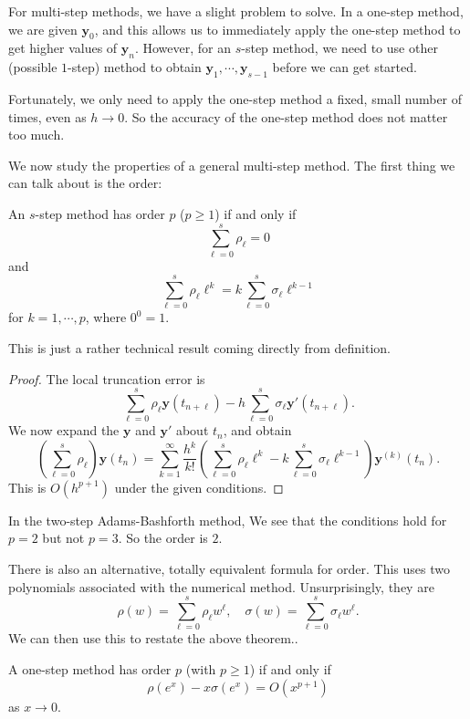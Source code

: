 \documentclass[a4paper]{article}
\begin{document}
For multi-step methods, we have a slight problem to solve. In a one-step method, we are given $\mathbf{y}_0$, and this allows us to immediately apply the one-step method to get higher values of $\mathbf{y}_n$. However, for an $s$-step method, we need to use other (possible $1$-step) method to obtain $\mathbf{y}_1, \cdots, \mathbf{y}_{s - 1}$ before we can get started.

Fortunately, we only need to apply the one-step method a fixed, small number of times, even as $h \to 0$. So the accuracy of the one-step method does not matter too much.

We now study the properties of a general multi-step method. The first thing we can talk about is the order:
\begin{thm}
  An $s$-step method has order $p$ ($p \geq 1$) if and only if
  \[
    \sum_{\ell = 0}^s \rho_\ell = 0
  \]
  and
  \[
    \sum_{\ell = 0}^s \rho_\ell \ell^k = k\sum_{\ell = 0}^s \sigma_\ell \ell^{k - 1}
  \]
  for $k = 1, \cdots, p$, where $0^0 = 1$.
\end{thm}

This is just a rather technical result coming directly from definition.
\begin{proof}
  The local truncation error is
  \[
    \sum_{\ell = 0}^s \rho_\ell \mathbf{y}(t_{n + \ell}) - h \sum_{\ell = 0}^s \sigma_\ell \mathbf{y}'(t_{n + \ell}).
  \]
  We now expand the $\mathbf{y}$ and $\mathbf{y}'$ about $t_n$, and obtain
  \[
    \left(\sum_{\ell = 0}^s \rho_\ell\right) \mathbf{y}(t_n) = \sum_{k = 1}^\infty \frac{h^k}{k!}\left(\sum_{\ell = 0}^s \rho_\ell \ell^k - k \sum_{\ell = 0}^s \sigma_\ell \ell^{k - 1}\right)\mathbf{y}^{(k)}(t_n).
  \]
  This is $O(h^{p + 1})$ under the given conditions.
\end{proof}

\begin{eg}[AB2]
  In the two-step Adams-Bashforth method, We see that the conditions hold for $p = 2$ but not $p = 3$. So the order is $2$.
\end{eg}

There is also an alternative, totally equivalent formula for order. This uses two polynomials associated with the numerical method. Unsurprisingly, they are
\[
  \rho(w) = \sum_{\ell = 0}^s \rho_\ell w^\ell,\quad \sigma(w) = \sum_{\ell = 0}^s \sigma_\ell w^\ell.
\]
We can then use this to restate the above theorem..
\begin{thm}
  A one-step method has order $p$ (with $p \geq 1$) if and only if
  \[
    \rho(e^x) - x \sigma(e^x) = O(x^{p + 1})
  \]
  as $x \to 0$.
\end{thm}
\end{document}
